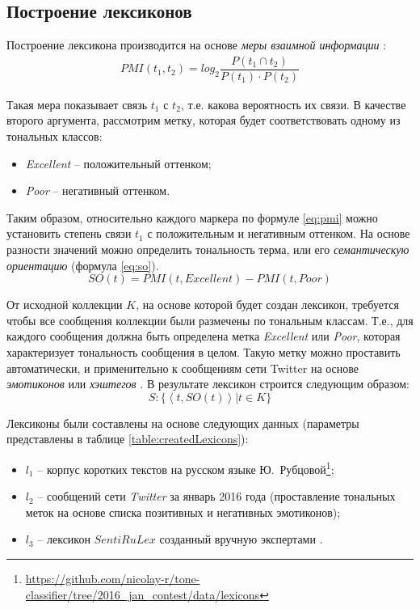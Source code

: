 \subsection{Построение лексиконов}

Построение лексикона производится на основе {\it меры взаимной информации}
\cite{lexiconSO}:
\begin{gather}
    PMI(t_1, t_2) = log_2 \dfrac{P(t_1\cap t_2)}{P(t_1)\cdot P(t_2)}
    \label{eq:pmi}
\end{gather}

Такая мера показывает связь $t_1$ с $t_2$, т.е. какова вероятность их связи.
В качестве второго аргумента, рассмотрим метку, которая будет соответствовать
одному из тональных классов:
\begin{itemize}
    \item {\it Excellent} -- положительный оттенком;
    \item {\it Poor} -- негативный оттенком.
\end{itemize}

Таким образом, относительно каждого маркера по формуле \ref{eq:pmi} можно
установить степень связи $t_1$ с положительным и негативным оттенком.
На основе разности значений можно определить тональность терма, или его
{\it семантическую ориентацию} (формула \ref{eq:so}).
\begin{equation}
    \label{eq:so}
    SO(t) = PMI(t, Excellent) - PMI(t, Poor)
\end{equation}

От исходной коллекции $K$, на основе которой будет создан лексикон, требуется
чтобы все сообщения коллекции были размечены по тональным классам.
Т.е., для каждого сообщения должна быть определена метка {\it Excellent} или
{\it Poor}, которая характеризует тональность сообщения в целом.
Такую метку можно проставить автоматически, и применительно к сообщениям
сети Twitter на основе {\it эмотиконов} или {\it хэштегов} \cite{severyn}.
В результате лексикон строится следующим образом:
\begin{equation}
    S : \{ \left< t, SO(t) \right> | t \in K\}
\end{equation}


Лексиконы были составлены на основе следующих данных (параметры представлены
в таблице \ref{table:createdLexicons}):

\begin{itemize}
    \item $l_1$ -- корпус коротких текстов на русском языке Ю.~Рубцовой\footnote{
        \url{https://github.com/nicolay-r/tone-classifier/tree/2016_jan_contest/data/lexicons}
    };
    \item $l_2$ -- сообщений сети {\it Twitter} за январь 2016 года
        (проставление тональных меток на основе списка позитивных и негативных
        эмотиконов);
    \item $l_3$ -- лексикон $SentiRuLex$ созданный вручную экспертами
        \cite{expertLexicon}.
\end{itemize}


